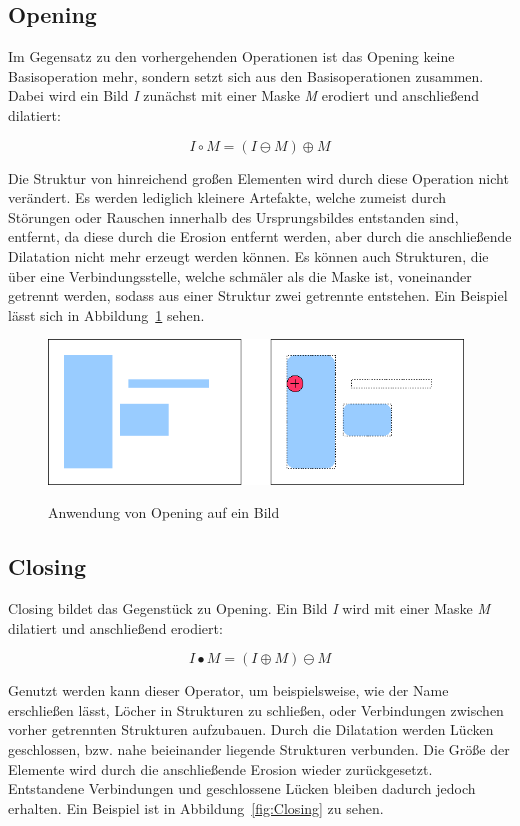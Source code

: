 \subsection{Opening}
Im Gegensatz zu den vorhergehenden Operationen ist das Opening keine Basisoperation mehr, sondern setzt sich aus den Basisoperationen zusammen.
Dabei wird ein Bild {\em I} zunächst mit einer Maske {\em M} erodiert und anschließend dilatiert:

$$ I \circ M = ( I \ominus M ) \oplus M $$

Die Struktur von hinreichend großen Elementen wird durch diese Operation nicht verändert. Es werden lediglich kleinere Artefakte, welche zumeist durch Störungen oder Rauschen innerhalb des Ursprungsbildes entstanden sind, entfernt, da diese durch die Erosion entfernt werden, aber durch die anschließende Dilatation nicht mehr erzeugt werden können. Es können auch Strukturen, die über eine Verbindungsstelle, welche schmäler als die Maske ist, voneinander getrennt werden, sodass aus einer Struktur zwei getrennte entstehen.
Ein Beispiel lässt sich in Abbildung~\ref{fig:Opening} sehen.

\begin{figure}[ht]
   \centering
     \includegraphics[width=11cm]{Bilder/MorphologicalOpening} \\
 \caption{Anwendung von Opening auf ein Bild}
 \label{fig:Opening}
\end{figure}

\subsection{Closing}
Closing bildet das Gegenstück zu Opening.
Ein Bild {\em I} wird mit einer Maske {\em M} dilatiert und anschließend erodiert:

$$ I \bullet M = ( I \oplus M ) \ominus M $$

Genutzt werden kann dieser Operator, um beispielsweise, wie der Name erschließen lässt, Löcher in Strukturen zu schließen, oder Verbindungen zwischen vorher getrennten Strukturen aufzubauen.
Durch die Dilatation werden Lücken geschlossen, bzw. nahe beieinander liegende Strukturen verbunden. Die Größe der Elemente wird durch die anschließende Erosion wieder zurückgesetzt. Entstandene Verbindungen und geschlossene Lücken bleiben dadurch jedoch erhalten.
Ein Beispiel ist in Abbildung~\ref{fig:Closing} zu sehen.

